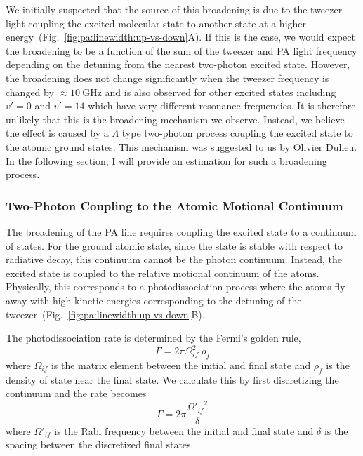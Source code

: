 We initially suspected that the source of this broadening is due to the tweezer light
coupling the excited molecular state to another state at
a higher energy~(Fig.~\ref{fig:pa:linewidth:up-vs-down}A).
If this is the case, we would expect the broadening to be a function of
the sum of the tweezer and PA light frequency depending on the detuning from the nearest
two-photon excited state.
However, the broadening does not change significantly when the tweezer frequency
is changed by $\approx\!10~\mathrm{GHz}$ and
is also observed for other excited states including $v'=0$ and $v'=14$
which have very different resonance frequencies.
It is therefore unlikely that this is the broadening mechanism we observe.
Instead, we believe the effect is caused by a $\Lambda$ type two-photon process
coupling the excited state to the atomic ground states.
This mechanism was suggested to us by Olivier Dulieu.
In the following section, I will provide an estimation for such a broadening process.

\subsubsection{Two-Photon Coupling to the Atomic Motional Continuum}
\label{ch:pa:linewidth:two-photn-down}
The broadening of the PA line requires coupling the excited state to a continuum of states.
For the ground atomic state, since the state is stable with respect to radiative decay,
this continuum cannot be the photon continuum.
Instead, the excited state is coupled to the relative motional continuum of the atoms.
Physically, this corresponds to a photodissociation process
where the atoms fly away with high kinetic energies corresponding
to the detuning of the tweezer~(Fig.~\ref{fig:pa:linewidth:up-vs-down}B).

The photodissociation rate is determined by the Fermi's golden rule,
\[
  \Gamma=2\pi\Omega_{if}^2\ \rho_f
\]
where $\Omega_{if}$ is the matrix element between the initial and final state
and $\rho_f$ is the density of state near the final state.
We calculate this by first discretizing the continuum and the rate becomes
\[
  \Gamma=2\pi\frac{{\Omega'_{if}}^2}{\delta}
\]
where $\Omega'_{if}$ is the Rabi frequency between the initial and final state
and $\delta$ is the spacing between the discretized final states.

